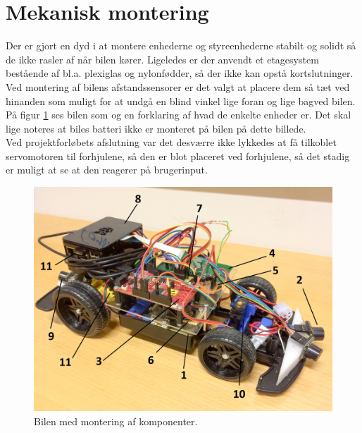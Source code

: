 \section{Mekanisk montering} \label{sec:mekanisk_montering}

Der er gjort en dyd i at montere enhederne og styreenhederne stabilt og solidt så de ikke rasler af når bilen kører. Ligeledes er der anvendt et etagesystem bestående af bl.a. plexiglas og nylonfødder, så der ikke kan opstå kortslutninger. Ved montering af bilens afstandssensorer er det valgt at placere dem så tæt ved hinanden som muligt for at undgå en blind vinkel lige foran og lige bagved bilen. På figur \ref{fig:billede_af_bil} ses bilen som og en forklaring af hvad de enkelte enheder er. Det skal lige noteres at biles batteri ikke er monteret på bilen på dette billede.\\
Ved projektforløbets afslutning var det desværre ikke lykkedes at få tilkoblet servomotoren til forhjulene, så den er blot placeret ved forhjulene, så det stadig er muligt at se at den reagerer på brugerinput.

\begin{figure}[h]
\centering
\includegraphics[width=\textwidth -1cm]{../fig/billeder/billede_af_bil.jpg}
\caption{Bilen med montering af komponenter.}
\label{fig:billede_af_bil}
\end{figure}

